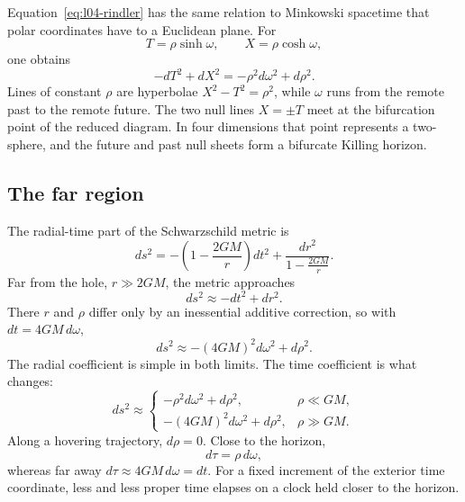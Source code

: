 Equation~\eqref{eq:l04-rindler} has the same relation to Minkowski spacetime that polar coordinates have to a Euclidean plane. For
\begin{equation}
T=\rho\sinh\omega,
\qquad
X=\rho\cosh\omega,
\end{equation}
one obtains
\begin{equation}
-dT^2+dX^2=-\rho^2d\omega^2+d\rho^2.
\end{equation}
Lines of constant \(\rho\) are hyperbolae \(X^2-T^2=\rho^2\), while \(\omega\) runs from the remote past to the remote future. The two null lines \(X=\pm T\) meet at the bifurcation point of the reduced diagram. In four dimensions that point represents a two-sphere, and the future and past null sheets form a bifurcate Killing horizon.

\subsection{The far region}

The radial-time part of the Schwarzschild metric is
\begin{equation}
ds^2
=-\left(1-\frac{2GM}{r}\right)dt^2
+\frac{dr^2}{1-\frac{2GM}{r}}.
\label{eq:l04-schwarzschild}
\end{equation}
Far from the hole, \(r\gg2GM\), the metric approaches
\begin{equation}
ds^2\approx-dt^2+dr^2.
\end{equation}
There \(r\) and \(\rho\) differ only by an inessential additive correction, so with \(dt=4GM\,d\omega\),
\begin{equation}
ds^2\approx-(4GM)^2d\omega^2+d\rho^2.
\label{eq:l04-far}
\end{equation}
The radial coefficient is simple in both limits. The time coefficient is what changes:
\begin{equation}
ds^2\approx
\begin{cases}
-\rho^2d\omega^2+d\rho^2, & \rho\ll GM,\\[3pt]
-(4GM)^2d\omega^2+d\rho^2, & \rho\gg GM.
\end{cases}
\label{eq:l04-two-limits}
\end{equation}
Along a hovering trajectory, \(d\rho=0\). Close to the horizon,
\begin{equation}
d\tau=\rho\,d\omega,
\end{equation}
whereas far away \(d\tau\approx4GM\,d\omega=dt\). For a fixed increment of the exterior time coordinate, less and less proper time elapses on a clock held closer to the horizon.

